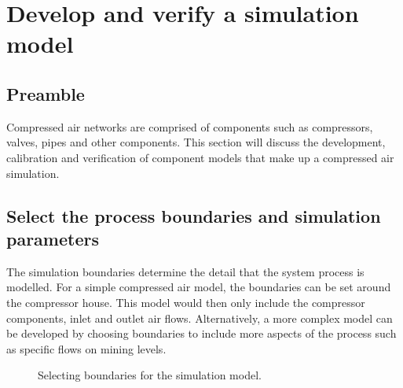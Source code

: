 \section{Develop and verify a simulation model}
	\subsection{Preamble}
	Compressed air networks are comprised of components such as compressors, valves, pipes and other components. This section will discuss the development, calibration and verification of component models that make up a compressed air simulation. 
	
	\subsection{Select the process boundaries and simulation parameters}
	The simulation boundaries determine the detail that the system process is modelled. For a simple compressed air model, the boundaries can be set around the compressor house. This model would then only include the compressor components, inlet and outlet air flows. Alternatively, a more complex model can be developed by choosing boundaries to include more aspects of the process such as specific flows on mining levels.
	
	 \begin{figure}[h]
	 	\centering
	 	\caption{ Selecting boundaries for the simulation model.}
	 	\label{fig: Sensitivity}
	 \end{figure}
 
